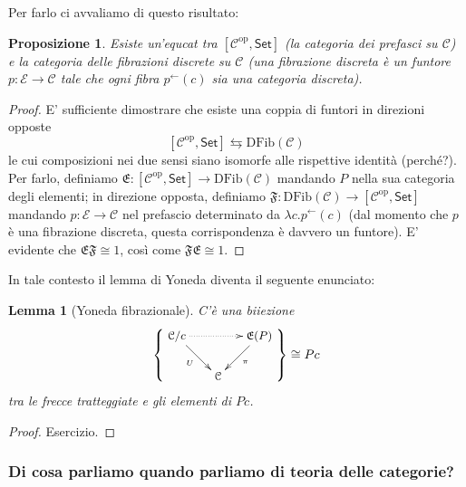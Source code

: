 \documentclass[11pt]{article}
\def\C{\mathcal{C}}
\def\Set{\mathsf{Set}}
\def\opp{\mathrm{op}}
\theoremstyle{reference}
\newtheorem{lemma}[theorem]{Lemma}
\newtheorem{proposition}[theorem]{Proposizione}
\begin{document}
Per farlo ci avvaliamo di questo risultato:
\begin{proposition}
Esiste un’equcat tra $[\C^\opp,\Set]$ (la categoria dei
prefasci su $\C$) e la categoria delle \emph{fibrazioni discrete}
su $\C$ (una fibrazione discreta è un funtore $p : \mathcal
E \to \C$ tale che ogni fibra $p^\leftarrow(c)$ sia una
categoria discreta). 
\end{proposition}
\begin{proof}
E' sufficiente dimostrare che esiste una coppia di funtori
in direzioni opposte 
$$ [\C^\opp,\Set] \leftrightarrows
\text{DFib}(\C) $$ 
le cui composizioni nei due sensi siano
isomorfe alle rispettive identità (perché?). Per farlo,
definiamo ${\mathfrak E} : [\C^\opp,\Set] \to
\text{DFib}(\C)$ mandando $P$ nella sua categoria degli
elementi; in direzione opposta, definiamo ${\mathfrak F} :
\text{DFib}(\C) \to [\C^\opp,\Set]$ mandando $p : \mathcal
E\to \C$ nel prefascio determinato da $\lambda
c.p^\leftarrow(c)$ (dal momento che $p$ è una fibrazione
discreta, questa corrispondenza è davvero un funtore). E'
evidente che $\mathfrak{EF}\cong 1$, così come
$\mathfrak{FE}\cong 1$.
\end{proof}
In tale contesto il lemma di Yoneda diventa il seguente enunciato:
\begin{lemma}[Yoneda fibrazionale]
C'è una biiezione
$$\left\{
{\small 
\vcenter{
  \xymatrix@!=3mm{
  \C/c \ar@{.>}[rr]\ar[dr]_U && \mathfrak E(P)\ar[dl]^\pi \\
  & \C & 
  }
}}
\right\} \cong Pc$$
tra le frecce tratteggiate e gli elementi di $Pc$.
\end{lemma}
\begin{proof}
Esercizio.
\end{proof}

\subsubsection{Di cosa parliamo quando parliamo di teoria delle categorie?}
\label{sec:org743f4d5}
\end{document}
